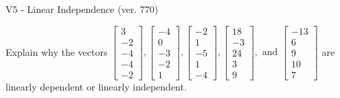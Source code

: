 \begin{exercise}
  \begin{exerciseTitle}V5 - Linear Independence (ver. 770)\end{exerciseTitle}
  \begin{exerciseStatement}
    Explain why the vectors \(\left[\begin{array}{r}
3 \\
-2 \\
-4 \\
-4 \\
-2
\end{array}\right] , \left[\begin{array}{r}
-4 \\
0 \\
-3 \\
-2 \\
1
\end{array}\right] , \left[\begin{array}{r}
-2 \\
1 \\
-5 \\
1 \\
-4
\end{array}\right] , \left[\begin{array}{r}
18 \\
-3 \\
24 \\
3 \\
9
\end{array}\right] , \text{ and } \left[\begin{array}{r}
-13 \\
6 \\
9 \\
10 \\
7
\end{array}\right]\) are linearly dependent or linearly independent.	



\end{exerciseStatement}
\end{exercise}
